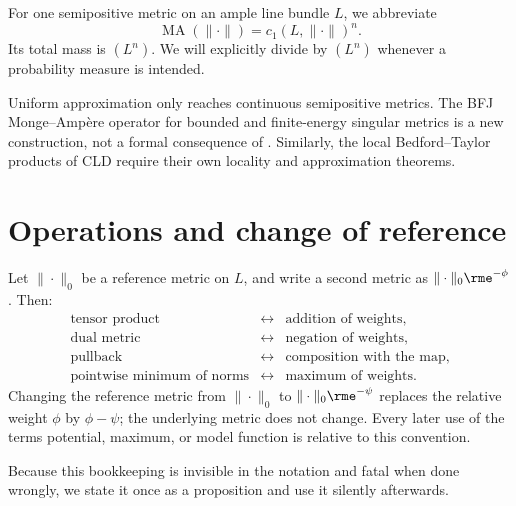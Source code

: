 For one semipositive metric on an ample line bundle $L$, we abbreviate
\[
               \operatorname{MA}(\|\cdot\|)
               =c_1(L,\|\cdot\|)^n.
\]
Its total mass is $(L^n)$. We will explicitly divide by $(L^n)$ whenever
a probability measure is intended.

\begin{remark}
\label{rem:metrics-singular-theory-boundary}
Uniform approximation only reaches continuous semipositive metrics. The BFJ
Monge--Amp\`ere operator for bounded and finite-energy singular metrics is a
new construction, not a formal consequence of
. Similarly, the local
Bedford--Taylor products of CLD require their own locality and approximation
theorems.
\end{remark}

\section{Operations and change of reference}
\label{sec:metrics-operations}

Let $\|\cdot\|_0$ be a reference metric on $L$, and write a second metric
as $\|\cdot\|_0\rme^{-\phi}$. Then:
\[
\begin{array}{ccl}
\text{tensor product} &\longleftrightarrow& \text{addition of weights},\\
\text{dual metric} &\longleftrightarrow& \text{negation of weights},\\
\text{pullback} &\longleftrightarrow& \text{composition with the map},\\
\text{pointwise minimum of norms}
  &\longleftrightarrow& \text{maximum of weights}.
\end{array}
\]
Changing the reference metric from $\|\cdot\|_0$ to
$\|\cdot\|_0\rme^{-\psi}$ replaces the relative weight $\phi$ by
$\phi-\psi$; the underlying metric does not change. Every later use of the
terms potential, maximum, or model function is relative to this convention.

Because this bookkeeping is invisible in the notation and fatal when done
wrongly, we state it once as a proposition and use it silently afterwards.

